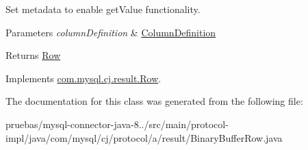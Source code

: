Set metadata to enable get\+Value functionality.


\begin{DoxyParams}{Parameters}
{\em column\+Definition} & \mbox{\hyperlink{interfacecom_1_1mysql_1_1cj_1_1protocol_1_1_column_definition}{Column\+Definition}} \\
\hline
\end{DoxyParams}
\begin{DoxyReturn}{Returns}
\mbox{\hyperlink{}{Row}} 
\end{DoxyReturn}


Implements \mbox{\hyperlink{interfacecom_1_1mysql_1_1cj_1_1result_1_1_row_ab80b0f47123d2771840acead9bc094d0}{com.\+mysql.\+cj.\+result.\+Row}}.



The documentation for this class was generated from the following file\+:\begin{DoxyCompactItemize}
\item 
pruebas/mysql-\/connector-\/java-\/8../src/main/protocol-\/impl/java/com/mysql/cj/protocol/a/result/Binary\+Buffer\+Row.\+java\end{DoxyCompactItemize}
